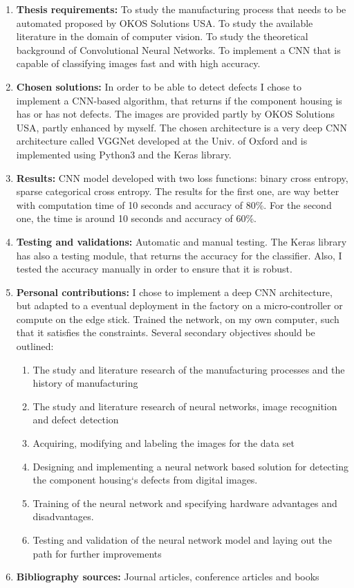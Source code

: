 \documentclass[12pt,a4paper,twoside]{report}
\begin{document}
\begin{enumerate}
\item {\bf Thesis requirements:} To study the manufacturing process that needs to be automated proposed by OKOS Solutions USA. To study the available literature in the domain of computer vision. To study the theoretical background of Convolutional Neural Networks. To implement a CNN that is capable of classifying images fast and with high accuracy.
\item {\bf Chosen solutions:} In order to be able to detect defects I chose to implement a CNN-based algorithm, that returns if the component housing is has or has not defects. The images are provided partly by OKOS Solutions USA, partly enhanced by myself. The chosen architecture is a very deep CNN architecture called VGGNet developed at the Univ. of Oxford and is implemented using Python3 and the Keras library.
\item {\bf Results:} CNN model developed with two loss functions: binary cross entropy, sparse categorical cross entropy. The results for the first one, are way better with computation time of 10 seconds and accuracy of 80\%. For the second one, the time is around 10 seconds and accuracy of 60\%.
\item {\bf Testing and validations:} Automatic and manual testing. The Keras library has also a testing module, that returns the accuracy for the classifier. Also, I tested the accuracy manually in order to ensure that it is robust.
\item {\bf Personal contributions:} I chose to implement a deep CNN architecture, but adapted to a eventual deployment in the factory on a micro-controller or compute on the edge stick. Trained the network, on my own computer, such that it satisfies the constraints. Several secondary objectives should be outlined:
\begin{enumerate}
    \item The study and literature research of the manufacturing processes and the history of manufacturing
    \item The study and literature research of neural networks, image recognition and defect detection
    \item Acquiring, modifying and labeling the images for the data set
    \item Designing and implementing a neural network based solution for detecting the component housing`s defects from digital images.
    \item Training of the neural network and specifying hardware advantages and disadvantages.
    \item Testing and validation of the neural network model and laying out the path for further improvements
\end{enumerate}
\item {\bf Bibliography sources:} Journal articles, conference articles and books
  \end{enumerate}
\vspace{1cm}
\end{document}

